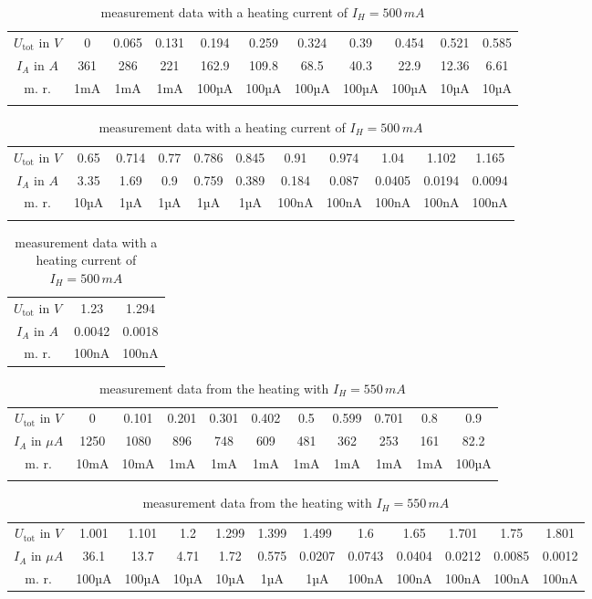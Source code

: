 \documentclass[a4paper, 12pt]{scrartcl}
\begin{document}
\begin{table}[H]\begin{tabular}{ccccccccccc}$U_\text{tot}$ in $V$&0&
0.065&
0.131&
0.194&
0.259&
0.324&
0.39&
0.454&
0.521&
0.585\\
$I_A$ in $A$&361&
286&
221&
162.9&
109.8&
68.5&
40.3&
22.9&
12.36&
6.61\\
m. r.&1mA&
1mA&
1mA&
100µA&
100µA&
100µA&
100µA&
100µA&
10µA&
10µA\\
&&&&&&&&&&\end{tabular}\newline
\begin{tabular}{ccccccccccc}
$U_\text{tot}$ in $V$&0.65&
0.714&
0.77&
0.786&
0.845&
0.91&
0.974&
1.04&
1.102&
1.165\\
$I_A$ in $A$&3.35&
1.69&
0.9&
0.759&
0.389&
0.184&
0.087&
0.0405&
0.0194&
0.0094\\
m. r.&10µA&
1µA&
1µA&
1µA&
1µA&
100nA&
100nA&
100nA&
100nA&
100nA\\
&&&&&&&&&&\end{tabular}
\newline
\begin{tabular}{ccc}$U_\text{tot}$ in $V$&1.23&
1.294\\
$I_A$ in $A$&0.0042&
0.0018\\
m. r.&100nA&
100nA\end{tabular}\caption{measurement data with a heating current of $I_H=500\,mA$}\end{table}

\begin{table}[H]\begin{tabular}{ccccccccccc}
$U_\text{tot}$ in $V$&0&
0.101&
0.201&
0.301&
0.402&
0.5&
0.599&
0.701&
0.8&
0.9\\
$I_A$ in $\mu{A}$&1250&
1080&
896&
748&
609&
481&
362&
253&
161&
82.2\\
m. r.&10mA&
10mA&
1mA&
1mA&
1mA&
1mA&
1mA&
1mA&
1mA&
100µA\\&&&&&&&&&&\end{tabular}\newline
\hspace*{-1cm}\begin{tabular}{cccccccccccc}
$U_\text{tot}$ in $V$&1.001&
1.101&
1.2&
1.299&
1.399&
1.499&
1.6&
1.65&
1.701&
1.75&
1.801\\
$I_A$ in $\mu{A}$&36.1&
13.7&
4.71&
1.72&
0.575&
0.0207&
0.0743&
0.0404&
0.0212&
0.0085&
0.0012\\
m. r.&100µA&
100µA&
10µA&
10µA&
1µA&
1µA&
100nA&
100nA&
100nA&
100nA&
100nA\end{tabular}
\caption{measurement data from the heating with $I_H=550\,mA$}\end{table}
\end{document}
